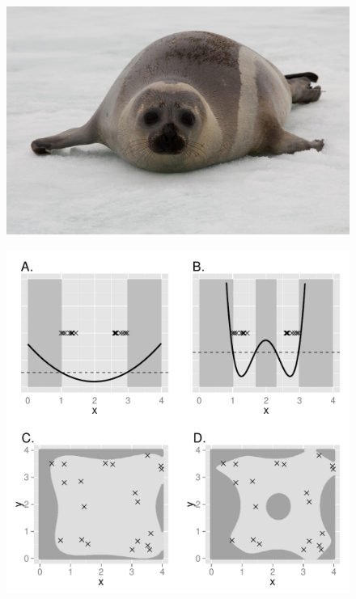 \documentclass[12pt,english]{article}
\begin{document}
\begin{spacing}{1.9}
\begin{figure}[!h]
\begin{center}
\includegraphics[width=6in]{ribbon}
\end{center}
\caption{ }
\label{fig:ribbon}
\end{figure}

\begin{figure}[!h]
\begin{center}
\includegraphics[width=6in]{IVH_simple2.pdf}
\end{center}
\caption{ }
\label{fig:IVH}
\end{figure}


\end{spacing}
\end{document}
